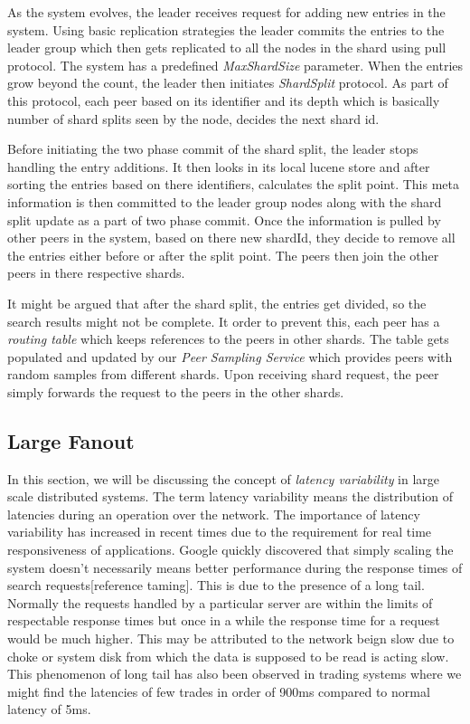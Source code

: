 \documentclass[a4paper, 11pt]{article}
\begin{document}
As the system evolves, the leader receives request for adding new entries in the system. Using basic replication strategies the leader commits the entries to the leader group which then gets replicated to all the nodes in the shard using pull protocol. The system has a predefined \textit{MaxShardSize} parameter. When the entries grow beyond the count, the leader then initiates \textit{ShardSplit} protocol. As part of this protocol, each peer based on its identifier and its depth which is basically number of shard splits seen by the node, decides the next shard id. 
\par Before initiating the two phase commit of the shard split, the leader stops handling the entry additions. It then looks in its local lucene store and after sorting the entries based on there identifiers, calculates the split point. This meta information is then committed to the leader group nodes along with the shard split update as a part of two phase commit. Once the information is pulled by other peers in the system, based on there new shardId, they decide to remove all the entries either before or after the split point. The peers then join the other peers in there respective shards. 
\par It might be argued that after the shard split, the entries get divided, so the search results might not be complete. It order to prevent this, each peer has a \textit{routing table} which keeps references to the peers in other shards. The table gets populated and updated by our \textit{Peer Sampling Service} which provides peers with random samples from different shards. Upon receiving shard request, the peer simply forwards the request to the peers in the other shards.


\subsection*{Large Fanout}
In this section, we will be discussing the concept of \textit{latency variability} in large scale distributed systems. The term latency variability means the distribution of latencies during an operation over the network. The importance of latency variability has increased in recent times due to the requirement for real time responsiveness of applications. Google quickly discovered that simply scaling the system doesn't necessarily means better performance during the response times of search requests[reference taming]. This is due to the presence of a long tail. Normally the requests handled by a particular server are within the limits of respectable response times but once in a while the response time for a request would be much higher. This may be attributed to the network beign slow due to choke or system disk from which the data is supposed to be read is acting slow. This phenomenon of long tail has also been observed in trading systems where we might find the latencies of few trades in order of 900ms compared to normal latency of 5ms. 
\end{document}
